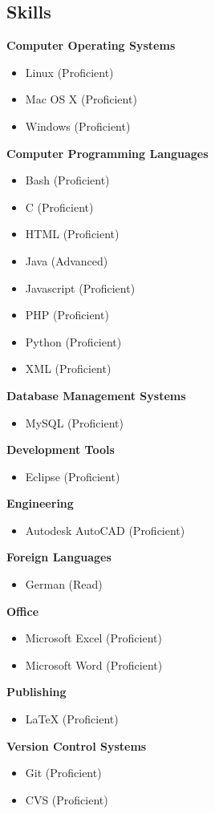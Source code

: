 \documentclass{res}
\begin{document}
\begin{resume}
\section{Skills}          
    \textbf{Computer Operating Systems}
        \begin{itemize}
 	        \item Linux (Proficient)
            \item Mac OS X (Proficient)
            \item Windows (Proficient)
        \end{itemize}
    \textbf{Computer Programming Languages}
        \begin{itemize}
            \item Bash (Proficient)
            \item C (Proficient)
            \item HTML (Proficient)
 	        \item Java (Advanced)
            \item Javascript (Proficient)
            \item PHP (Proficient)
 	        \item Python (Proficient)
            \item XML (Proficient)
        \end{itemize}
    \textbf{Database Management Systems}
        \begin{itemize}
 	        \item MySQL (Proficient)
        \end{itemize}
    \textbf{Development Tools}
        \begin{itemize}
            \item Eclipse (Proficient)
        \end{itemize}
    \textbf{Engineering}
        \begin{itemize}
 	        \item Autodesk AutoCAD (Proficient)
        \end{itemize}
    \textbf{Foreign Languages}
        \begin{itemize}
 	        \item German (Read)
        \end{itemize}
    \textbf{Office}
        \begin{itemize}
            \item Microsoft Excel (Proficient)
 	        \item Microsoft Word (Proficient)
        \end{itemize}
    \textbf{Publishing}
        \begin{itemize}
 	        \item \LaTeX{} (Proficient)
        \end{itemize}
    \textbf{Version Control Systems}
        \begin{itemize}
            \item Git (Proficient)
            \item CVS (Proficient)
        \end{itemize}


\end{resume}
\end{document}

